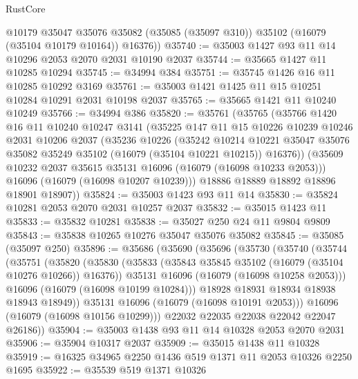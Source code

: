 \begin{lexlean}{RustCore}
\begin{coremodule}
        @10179
        @35047
        @35076
        @35082
        (@35085 (@35097 @310))
        @35102
        (@16079 (@35104 @10179 @10164))
        @16376))
@35740 := @35003 @1427 @93 @11 @14 @10296 @2053 @2070 @2031 @10190 @2037
@35744 := @35665 @1427 @11 @10285 @10294
@35745 := @34994 @384
@35751 := @35745 @1426 @16 @11 @10285 @10292 @3169
@35761 := @35003 @1421 @1425 @11 @15 @10251 @10284 @10291 @2031 @10198 @2037
@35765 := @35665 @1421 @11 @10240 @10249
@35766 := @34994 @386
@35820 := @35761
    (@35765
      (@35766
        @1420
        @16
        @11
        @10240
        @10247
        @3141
        (@35225
          @147
          @11
          @15
          @10226
          @10239
          @10246
          @2031
          @10206
          @2037
          (@35236
            @10226
            (@35242
              @10214
              @10221
              @35047
              @35076
              @35082
              @35249
              @35102
              (@16079 (@35104 @10221 @10215))
              @16376))
          (@35609 @10232 @2037 @35615 @35131 @16096 (@16079 (@16098 @10233 @2053)))
          @16096
          (@16079 (@16098 @10207 @10239)))
        @18886
        @18889
        @18892
        @18896
        @18901
        @18907))
@35824 := @35003 @1423 @93 @11 @14
@35830 := @35824 @10281 @2053 @2070 @2031 @10257 @2037
@35832 := @35015 @1423 @11
@35833 := @35832 @10281
@35838 := @35027 @250 @24 @11 @9804 @9809
@35843 := @35838 @10265 @10276 @35047 @35076 @35082
@35845 := @35085 (@35097 @250)
@35896 := @35686
    (@35690
      (@35696
        (@35730
          (@35740
            (@35744
              (@35751
                (@35820
                  (@35830
                    (@35833 (@35843 @35845 @35102 (@16079 (@35104 @10276 @10266)) @16376))
                    @35131
                    @16096
                    (@16079 (@16098 @10258 @2053)))
                  @16096
                  (@16079 (@16098 @10199 @10284)))
                @18928
                @18931
                @18934
                @18938
                @18943
                @18949))
            @35131
            @16096
            (@16079 (@16098 @10191 @2053)))
          @16096
          (@16079 (@16098 @10156 @10299)))
        @22032
        @22035
        @22038
        @22042
        @22047
        @26186))
@35904 := @35003 @1438 @93 @11 @14 @10328 @2053 @2070 @2031
@35906 := @35904 @10317 @2037
@35909 := @35015 @1438 @11 @10328
@35919 := @16325 @34965 @2250 @1436 @519 @1371 @11 @2053 @10326 @2250 @1695
@35922 := @35539 @519 @1371 @10326

\end{coremodule}
\end{lexlean}
